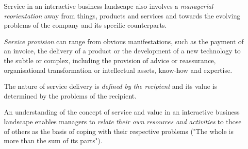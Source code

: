 \documentclass[11pt,a4paper]{article}
\begin{document}
Service in an interactive business landscape also involves a \emph{managerial
  reorientation} away from things, products and services and towards the
evolving problems of the company and its speciﬁc counterparts.

\emph{Service provision} can range from obvious manifestations, such as the
payment of an invoice, the delivery of a product or the development of a new
technology to the subtle or complex, including the provision of advice or
reassurance, organisational transformation or intellectual assets, know-how
and expertise.

The nature of service delivery is \emph{deﬁned by the recipient} and its value
is determined by the problems of the recipient.

An understanding of the concept of service and value in an interactive
business landscape enables managers to \emph{relate their own resources and
  activities} to those of others as the basis of coping with their respective
problems ("The whole is more than the sum of its parts").
\end{document}
